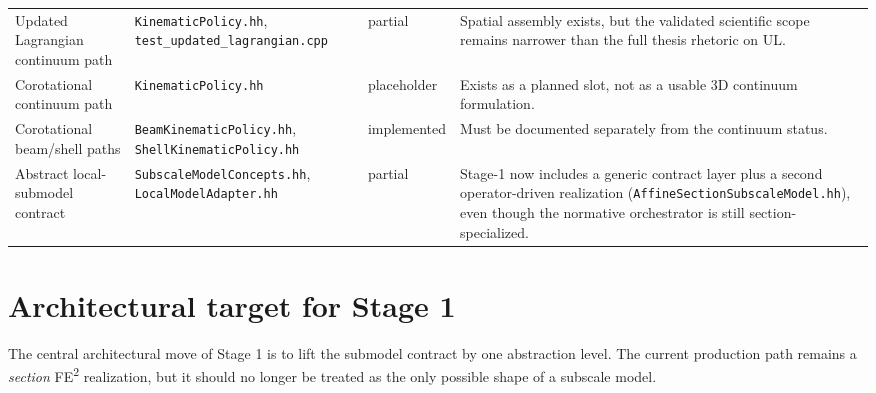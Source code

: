 \begin{table}[htbp]
\begin{tabular}{@{}p{}p{}p{}p{}@{}}
    Updated Lagrangian continuum path
    & \texttt{KinematicPolicy.hh}, \texttt{test\_updated\_lagrangian.cpp}
    & partial
    & Spatial assembly exists, but the validated scientific scope remains
      narrower than the full thesis rhetoric on UL. \\

    Corotational continuum path
    & \texttt{KinematicPolicy.hh}
    & placeholder
    & Exists as a planned slot, not as a usable 3D continuum formulation. \\

    Corotational beam/shell paths
    & \texttt{BeamKinematicPolicy.hh}, \texttt{ShellKinematicPolicy.hh}
    & implemented
    & Must be documented separately from the continuum status. \\

    Abstract local-submodel contract
    & \texttt{SubscaleModelConcepts.hh}, \texttt{LocalModelAdapter.hh}
    & partial
    & Stage-1 now includes a generic contract layer plus a second
      operator-driven realization (\texttt{AffineSectionSubscaleModel.hh}),
      even though the normative orchestrator is still section-specialized. \\
    \bottomrule
  \end{tabular}
\end{table}

\section{Architectural target for Stage 1}

The central architectural move of Stage 1 is to lift the submodel contract by
one abstraction level.  The current production path remains a \emph{section}
FE\textsuperscript{2} realization, but it should no longer be treated as the
only possible shape of a subscale model.

